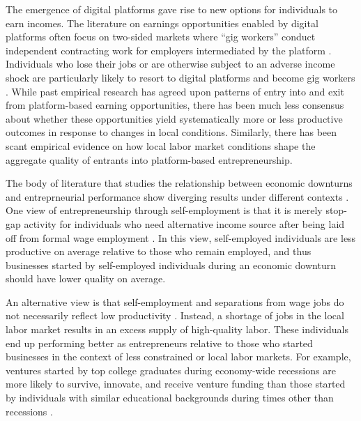 \documentclass[letterpaper,12pt]{article}
\begin{document}

The emergence of digital platforms gave rise to new options for individuals to earn incomes. The literature on earnings opportunities enabled by digital platforms often focus on two-sided markets where ``gig workers'' conduct independent contracting work for employers intermediated by the platform \citep{abraham_measuring_2017,collins_is_2019,katz_understanding_2019,abraham_what_2022}. Individuals who lose their jobs or are otherwise subject to an adverse income shock are particularly likely to resort to digital platforms and become gig workers \citep{garin_is_2020,huang_unemployment_2020,laitenberger2023unemployment,jackson_availability_2022}. While past empirical research has agreed upon patterns of entry into and exit from platform-based earning opportunities, there has been much less consensus about whether these opportunities yield systematically more or less productive outcomes in response to changes in local conditions. Similarly, there has been scant empirical evidence on how local labor market conditions shape the aggregate quality of entrants into platform-based entrepreneurship.

The body of literature that studies the relationship between economic downturns and entreprneurial performance show diverging results under different contexts \citep{conti2021lowering,hacamo_forced_2022,steffens2023asymmetric}. One view of entrepreneurship through self-employment is that it is merely stop-gap activity for individuals who need alternative income source after being laid off from formal wage employment \citep{evans_small_1990,kaiser_is_2011}. In this view, self-employed individuals are less productive on average relative to those who remain employed, and thus businesses started by self-employed individuals during an economic downturn should have lower quality on average.

An alternative view is that self-employment and separations from wage jobs do not necessarily reflect low productivity \citep{yagan_employment_2019,koch_career_2021}. Instead, a shortage of jobs in the local labor market results in an excess supply of high-quality labor. These individuals end up performing better as entrepreneurs relative to those who started businesses in the context of less constrained or local labor markets. For example, ventures started by top college graduates during economy-wide recessions are more likely to survive, innovate, and receive venture funding than those started by individuals with similar educational backgrounds during times other than recessions \citep{hacamo_forced_2022}. 
\end{document}
